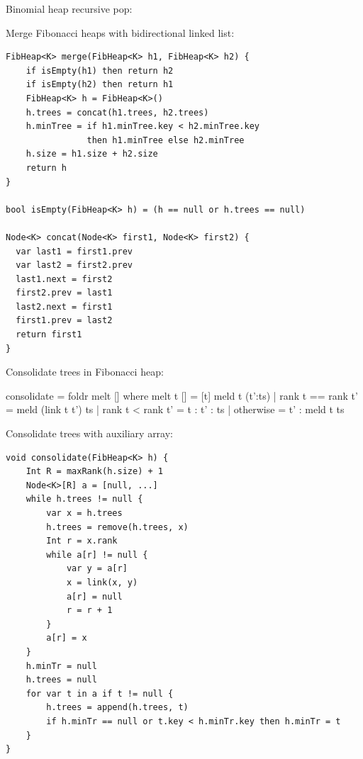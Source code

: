 \documentclass[b5paper]{article}
\begin{document}
Binomial heap recursive pop:


Merge Fibonacci heaps with bidirectional linked list:

\begin{lstlisting}[language = Bourbaki]
FibHeap<K> merge(FibHeap<K> h1, FibHeap<K> h2) {
    if isEmpty(h1) then return h2
    if isEmpty(h2) then return h1
    FibHeap<K> h = FibHeap<K>()
    h.trees = concat(h1.trees, h2.trees)
    h.minTree = if h1.minTree.key < h2.minTree.key
                then h1.minTree else h2.minTree
    h.size = h1.size + h2.size
    return h
}

bool isEmpty(FibHeap<K> h) = (h == null or h.trees == null)

Node<K> concat(Node<K> first1, Node<K> first2) {
  var last1 = first1.prev
  var last2 = first2.prev
  last1.next = first2
  first2.prev = last1
  last2.next = first1
  first1.prev = last2
  return first1
}
\end{lstlisting}

Consolidate trees in Fibonacci heap:

\begin{Haskell}
consolidate = foldr melt [] where
    melt t [] = [t]
    meld t (t':ts) | rank t == rank t' = meld (link t t') ts
                   | rank t <  rank t' = t : t' : ts
                   | otherwise = t' : meld t ts
\end{Haskell}

Consolidate trees with auxiliary array:

\begin{lstlisting}[language = Bourbaki]
void consolidate(FibHeap<K> h) {
    Int R = maxRank(h.size) + 1
    Node<K>[R] a = [null, ...]
    while h.trees != null {
        var x = h.trees
        h.trees = remove(h.trees, x)
        Int r = x.rank
        while a[r] != null {
            var y = a[r]
            x = link(x, y)
            a[r] = null
            r = r + 1
        }
        a[r] = x
    }
    h.minTr = null
    h.trees = null
    for var t in a if t != null {
        h.trees = append(h.trees, t)
        if h.minTr == null or t.key < h.minTr.key then h.minTr = t
    }
}
\end{lstlisting}
\end{document}
